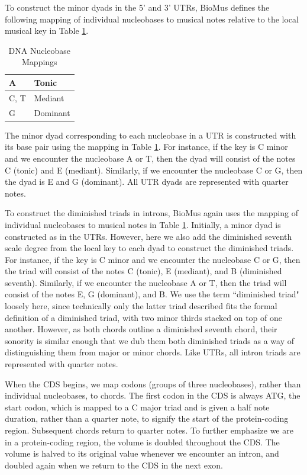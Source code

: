\documentclass[letterpaper]{article}
\begin{document}
To construct the minor dyads in the 5' and 3' UTRs, BioMus defines the following mapping of individual nucleobases to musical notes relative to the local musical key in Table  \ref{table:nucleobases}.

\begin{table}[h!]
\centering
\begin{tabular}{|l|l|}
\hline
A   & Tonic    \\ \hline
C, T & Mediant  \\ \hline
G   & Dominant \\ \hline
\end{tabular}
\caption{DNA Nucleobase Mappings}
\label{table:nucleobases}
\end{table}

The minor dyad corresponding to each nucleobase in a UTR is constructed with its base pair using the mapping in Table  \ref{table:nucleobases}. For instance, if the key is C minor and we encounter the nucleobase A or T, then the dyad will consist of the notes C (tonic) and E\musFlat \; (mediant). Similarly, if we encounter the nucleobase C or G, then the dyad is E\musFlat \; and G (dominant). All UTR dyads are represented with quarter notes.

To construct the diminished triads in introns, BioMus again uses the mapping of individual nucleobases to musical notes in Table  \ref{table:nucleobases}. Initially, a minor dyad is constructed as in the UTRs. However, here we also add the diminished seventh scale degree from the local key to each dyad to construct the diminished triads. For instance, if the key is C minor and we encounter the nucleobase C or G, then the triad will consist of the notes C (tonic), E\musFlat \; (mediant), and B\musDoubleFlat\; (diminished seventh). Similarly, if we encounter the nucleobase A or T, then the triad will consist of the notes E\musFlat, G (dominant), and B\musDoubleFlat. We use the term ``diminished triad" loosely here, since technically only the latter triad described fits the formal definition of a diminished triad, with two minor thirds stacked on top of one another. However, as both chords outline a diminished seventh chord, their sonority is similar enough that we dub them both diminished triads as a way of distinguishing them from major or minor chords. Like UTRs, all intron triads are represented with quarter notes. 

When the CDS begins, we map codons (groups of three nucleobases), rather than individual nucleobases, to chords. The first codon in the CDS is always ATG, the start codon, which is mapped to a C major triad and is given a half note duration, rather than a quarter note, to signify the start of the protein-coding region. Subsequent chords return to quarter notes. To further emphasize we are in a protein-coding region, the volume is doubled throughout the CDS. The volume is halved to its original value whenever we encounter an intron, and doubled again when we return to the CDS in the next exon. 
\end{document}

